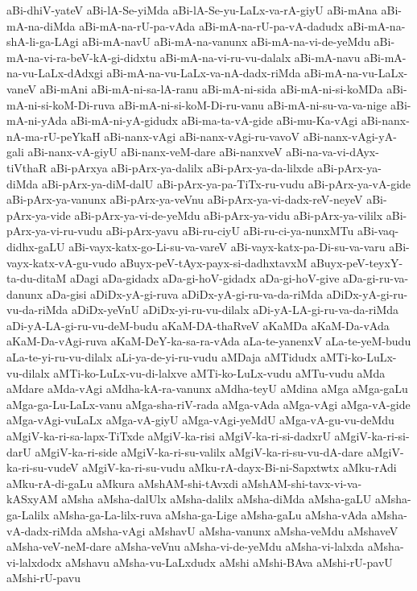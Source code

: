 {aBi-dhiV-yateV
aBi-lA-Se-yiMda
aBi-lA-Se-yu-LaLx-va-rA-giyU
aBi-mAna
aBi-mA-na-diMda
aBi-mA-na-rU-pa-vAda
aBi-mA-na-rU-pa-vA-dadudx
aBi-mA-na-shA-li-ga-LAgi
aBi-mA-navU
aBi-mA-na-vanunx
aBi-mA-na-vi-de-yeMdu
aBi-mA-na-vi-ra-beV-kA-gi-didxtu
aBi-mA-na-vi-ru-vu-dalalx
aBi-mA-navu
aBi-mA-na-vu-LaLx-dAdxgi
aBi-mA-na-vu-LaLx-va-nA-dadx-riMda
aBi-mA-na-vu-LaLx-vaneV
aBi-mAni
aBi-mA-ni-sa-lA-ranu
aBi-mA-ni-sida
aBi-mA-ni-si-koMDa
aBi-mA-ni-si-koM-Di-ruva
aBi-mA-ni-si-koM-Di-ru-vanu
aBi-mA-ni-su-va-va-nige
aBi-mA-ni-yAda
aBi-mA-ni-yA-gidudx
aBi-ma-ta-vA-gide
aBi-mu-Ka-vAgi
aBi-nanx-nA-ma-rU-peYkaH
aBi-nanx-vAgi
aBi-nanx-vAgi-ru-vavoV
aBi-nanx-vAgi-yA-gali
aBi-nanx-vA-giyU
aBi-nanx-veM-dare
aBi-nanxveV
aBi-na-va-vi-dAyx-tiVthaR
aBi-pArxya
aBi-pArx-ya-dalilx
aBi-pArx-ya-da-lilxde
aBi-pArx-ya-diMda
aBi-pArx-ya-diM-dalU
aBi-pArx-ya-pa-TiTx-ru-vudu
aBi-pArx-ya-vA-gide
aBi-pArx-ya-vanunx
aBi-pArx-ya-veVnu
aBi-pArx-ya-vi-dadx-reV-neyeV
aBi-pArx-ya-vide
aBi-pArx-ya-vi-de-yeMdu
aBi-pArx-ya-vidu
aBi-pArx-ya-vililx
aBi-pArx-ya-vi-ru-vudu
aBi-pArx-yavu
aBi-ru-ciyU
aBi-ru-ci-ya-nunxMTu
aBi-vaq-didhx-gaLU
aBi-vayx-katx-go-Li-su-va-vareV
aBi-vayx-katx-pa-Di-su-va-varu
aBi-vayx-katx-vA-gu-vudo
aBuyx-peV-tAyx-payx-si-dadhxtavxM
aBuyx-peV-teyxY-ta-du-ditaM
aDagi
aDa-gidadx
aDa-gi-hoV-gidadx
aDa-gi-hoV-give
aDa-gi-ru-va-danunx
aDa-gisi
aDiDx-yA-gi-ruva
aDiDx-yA-gi-ru-va-da-riMda
aDiDx-yA-gi-ru-vu-da-riMda
aDiDx-yeVnU
aDiDx-yi-ru-vu-dilalx
aDi-yA-LA-gi-ru-va-da-riMda
aDi-yA-LA-gi-ru-vu-deM-budu
aKaM-DA-thaRveV
aKaMDa
aKaM-Da-vAda
aKaM-Da-vAgi-ruva
aKaM-DeY-ka-sa-ra-vAda
aLa-te-yanenxV
aLa-te-yeM-budu
aLa-te-yi-ru-vu-dilalx
aLi-ya-de-yi-ru-vudu
aMDaja
aMTidudx
aMTi-ko-LuLx-vu-dilalx
aMTi-ko-LuLx-vu-di-lalxve
aMTi-ko-LuLx-vudu
aMTu-vudu
aMda
aMdare
aMda-vAgi
aMdha-kA-ra-vanunx
aMdha-teyU
aMdina
aMga
aMga-gaLu
aMga-ga-Lu-LaLx-vanu
aMga-sha-riV-rada
aMga-vAda
aMga-vAgi
aMga-vA-gide
aMga-vAgi-vuLaLx
aMga-vA-giyU
aMga-vAgi-yeMdU
aMga-vA-gu-vu-deMdu
aMgiV-ka-ri-sa-lapx-TiTxde
aMgiV-ka-risi
aMgiV-ka-ri-si-dadxrU
aMgiV-ka-ri-si-darU
aMgiV-ka-ri-side
aMgiV-ka-ri-su-valilx
aMgiV-ka-ri-su-vu-dA-dare
aMgiV-ka-ri-su-vudeV
aMgiV-ka-ri-su-vudu
aMku-rA-dayx-Bi-ni-Sapxtwtx
aMku-rAdi
aMku-rA-di-gaLu
aMkura
aMshAM-shi-tAvxdi
aMshAM-shi-tavx-vi-va-kASxyAM
aMsha
aMsha-dalUlx
aMsha-dalilx
aMsha-diMda
aMsha-gaLU
aMsha-ga-Lalilx
aMsha-ga-La-lilx-ruva
aMsha-ga-Lige
aMsha-gaLu
aMsha-vAda
aMsha-vA-dadx-riMda
aMsha-vAgi
aMshavU
aMsha-vanunx
aMsha-veMdu
aMshaveV
aMsha-veV-neM-dare
aMsha-veVnu
aMsha-vi-de-yeMdu
aMsha-vi-lalxda
aMsha-vi-lalxdodx
aMshavu
aMsha-vu-LaLxdudx
aMshi
aMshi-BAva
aMshi-rU-pavU
aMshi-rU-pavu
}
